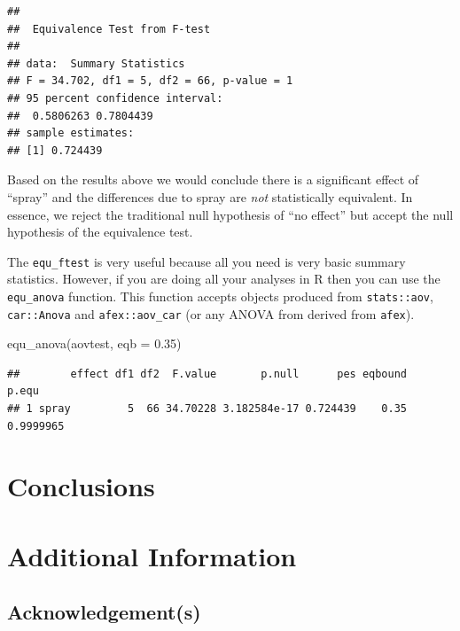 \documentclass[]{interact}
\theoremstyle{plain}%
\theoremstyle{definition}
\theoremstyle{remark}
\newenvironment{Shaded}{\begin{snugshade}}{\end{snugshade}}
\newcommand{\AttributeTok}[1]{\textcolor[rgb]{0.77,0.63,0.00}{#1}}
\newcommand{\FloatTok}[1]{\textcolor[rgb]{0.00,0.00,0.81}{#1}}
\newcommand{\FunctionTok}[1]{\textcolor[rgb]{0.00,0.00,0.00}{#1}}
\newcommand{\NormalTok}[1]{#1}
\begin{document}
\begin{verbatim}
## 
##  Equivalence Test from F-test
## 
## data:  Summary Statistics
## F = 34.702, df1 = 5, df2 = 66, p-value = 1
## 95 percent confidence interval:
##  0.5806263 0.7804439
## sample estimates:
## [1] 0.724439
\end{verbatim}

Based on the results above we would conclude there is a significant
effect of ``spray'' and the differences due to spray are \emph{not}
statistically equivalent. In essence, we reject the traditional null
hypothesis of ``no effect'' but accept the null hypothesis of the
equivalence test.

The \texttt{equ\_ftest} is very useful because all you need is very
basic summary statistics. However, if you are doing all your analyses in
R then you can use the \texttt{equ\_anova} function. This function
accepts objects produced from \texttt{stats::aov}, \texttt{car::Anova}
and \texttt{afex::aov\_car} (or any ANOVA from derived from
\texttt{afex}).

\begin{Shaded}
\begin{Highlighting}[]
\FunctionTok{equ\_anova}\NormalTok{(aovtest,}
          \AttributeTok{eqb =} \FloatTok{0.35}\NormalTok{)}
\end{Highlighting}
\end{Shaded}

\begin{verbatim}
##        effect df1 df2  F.value       p.null      pes eqbound     p.equ
## 1 spray         5  66 34.70228 3.182584e-17 0.724439    0.35 0.9999965
\end{verbatim}

\hypertarget{conclusions}{%
\section{Conclusions}\label{conclusions}}

\newpage

\hypertarget{additional-information}{%
\section{Additional Information}\label{additional-information}}

\hypertarget{acknowledgements}{%
\subsection*{Acknowledgement(s)}\label{acknowledgements}}
\end{document}
